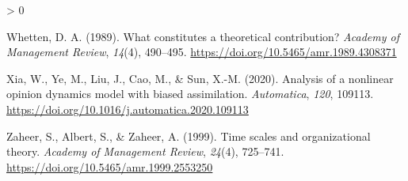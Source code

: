 \documentclass[
12pt, %
twoside,
english]{guelphthesis}
\newlength{\cslhangindent}
\newenvironment{CSLReferences}[2] %
 {%
  \setlength{\parindent}{0pt}
  \ifodd #1 \everypar{\setlength{\hangindent}{\cslhangindent}}\ignorespaces\fi
  \ifnum #2 > 0
  \setlength{\parskip}{\linespacing{2}}
  \fi
 }%
 {}
\begin{document}
\begin{CSLReferences}{1}{0}
\leavevmode{}%
Whetten, D. A. (1989). What constitutes a theoretical contribution? \emph{Academy of Management Review}, \emph{14}(4), 490--495. \url{https://doi.org/10.5465/amr.1989.4308371}

\leavevmode{}%
Xia, W., Ye, M., Liu, J., Cao, M., \& Sun, X.-M. (2020). Analysis of a nonlinear opinion dynamics model with biased assimilation. \emph{Automatica}, \emph{120}, 109113. \url{https://doi.org/10.1016/j.automatica.2020.109113}

\leavevmode{}%
Zaheer, S., Albert, S., \& Zaheer, A. (1999). Time scales and organizational theory. \emph{Academy of Management Review}, \emph{24}(4), 725--741. \url{https://doi.org/10.5465/amr.1999.2553250}

\end{CSLReferences}
\end{document}
